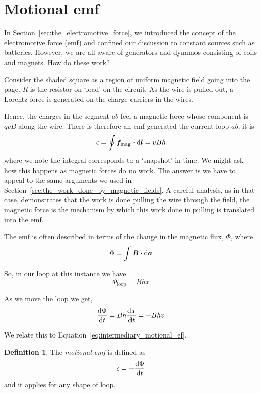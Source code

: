 \documentclass[12pt,chapterprefix=false,dvipsnames]{scrbook}
\theoremstyle{dotless}
\theoremstyle{definition}
\newtheorem{protodefinition}{Definition}[section]
\newenvironment{definition}
{\colorlet{shadecolor}{black!15}\begin{shaded}\begin{protodefinition}}
			{\end{protodefinition}\end{shaded}}
\begin{document}
\section{Motional emf}%
\label{sec:motional_emf}

In Section~\ref{sec:the_electromotive_force}, we introduced the concept
of the electromotive force (emf) and confined our discussion to
constant sources such as batteries. However, we are all aware of
generators and dynamos consisting of coils and magnets. How do
these work?

Consider the shaded square as a region of uniform magnetic field
going into the page. $R$ is the resistor on
`load' on the circuit. As the wire is pulled out, a Lorentz
force is generated on the charge carriers in the wires.

Hence, the charges in the segment $ab$ feel a
magnetic force whose component is $qvB$ along
the wire. There is therefore an emf generated the current loop
$ab$, it is
\begin{equation}
	\label{eq:intermediary_motional_ef}
	\epsilon =
	\oint\bm{f}_{\mathrm{mag}}\vdot\dd{\bm{l}}
	=
	vBh
\end{equation}
where we note the integral corresponds to a `snapshot' in time.
We might ask how this happens as magnetic forces do no work. The
answer is we have to appeal to the same arguments we used in
Section~\ref{sec:the_work_done_by_magnetic_fields}. A careful analysis, as in that
case, demonstrates that the work is done pulling the wire
through the field, the magnetic force is the mechanism by which
this work done in pulling is translated into the emf.

The emf is often described in terms of the change in the
magnetic flux, $\Phi$, where
\begin{equation}
	\Phi = \int\bm{B}\vdot\dd{\bm{a}}
\end{equation}

So, in our loop at this instance we have
\begin{equation}
	\Phi_{\mathrm{loop}}
	=
	Bhx
\end{equation}

As we move the loop we get,
\begin{equation}
	\dv{\Phi}{t} = Bh\dv{x}{t} = -Bhv
\end{equation}

We relate this to Equation~\ref{eq:intermediary_motional_ef}.

\begin{definition}
	The \textit{motional emf} is defined as
	\begin{equation}
		\label{eq:motional_emf}
		\epsilon = -\dv{\Phi}{t}
	\end{equation}
	and it applies for any shape of loop.
\end{definition}
\end{document}
